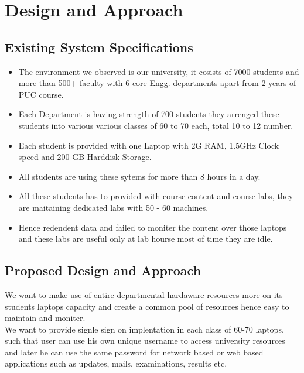 \documentclass[12pt]{report}
\begin{document}
\chapter{Design and Approach}

\section{Existing System Specifications}


\begin{itemize}
	\item The environment we observed is our university, it cosists of 7000 students and more than 500+ faculty with 6 core Engg. departments apart from 2 years of PUC course.
	\item Each Department is having strength of 700 students they arrenged these students into various various classes of 60 to 70 each, total 10 to 12 number. 
	\item Each student is provided with one Laptop with 2G RAM, 1.5GHz Clock speed and 200 GB Harddisk Storage. 
	\item All students are using these sytems for more than 8 hours in a day.
	\item All these students has to provided with course content and course labs, they are maitaining dedicated labs with 50 - 60 machines.
	\item Hence redendent data and failed to moniter the content over those laptops and these labs are useful only at lab hourse most of time they are idle.
\end{itemize}	

\section{Proposed Design and Approach}

	We want to make use of entire departmental hardaware resources more on its students laptops capacity and create a common pool of resources hence easy to maintain and moniter.\\
	
	We want to provide signle sign on implentation in each class of 60-70 laptops. such that user can use his own unique username to access university resources and later he can use the same password for network based or web based applications such as updates, mails, examinations, results etc.\newline
	
\end{document}
